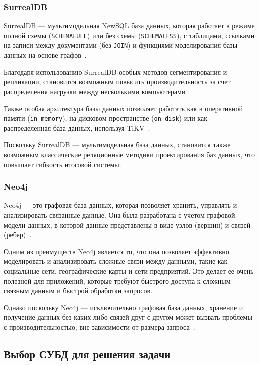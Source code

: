 \subsubsection{SurrealDB}

SurrealDB --- мультимодельная NewSQL база данных, которая работает в режиме полной схемы (\texttt{SCHEMAFULL}) или без схемы (\texttt{SCHEMALESS}), с таблицами, ссылками на записи между документами (без \texttt{JOIN}) и функциями моделирования базы данных на основе графов~\cite{surrealdb}.

Благодаря использованию SurrealDB особых методов сегментирования и репликации, становится возможным повысить производительность за счет распределения нагрузки между несколькими компьютерами~\cite{surrealarch}.

Также особая архитектура базы данных позволяет работать как в оперативной памяти (\texttt{in-memory}), на дисковом пространстве (\texttt{on-disk}) или как распределенная база данных, используя TiKV~\cite{tikv}.

Поскольку SurrealDB --- мультимодельная база данных, становится также возможным классические реляционные методики проектирования баз данных, что повышает гибкость итоговой системы.

\subsubsection{Neo4j}

Neo4j --- это графовая база данных, которая позволяет хранить, управлять и анализировать связанные данные. 
Она была разработана с учетом графовой модели данных, в которой данные представлены в виде узлов (вершин) и связей (ребер)~\cite{neo4j}. 

Одним из преимуществ Neo4j является то, что она позволяет эффективно моделировать и анализировать сложные связи между данными, такие как социальные сети, географические карты и сети предприятий.
Это делает ее очень полезной для приложений, которые требуют быстрого доступа к сложным связным данным и быстрой обработки запросов.

Однако поскольку Neo4j --- исключительно графовая база данных, хранение и получение данных без каких-либо связей друг с другом может вызвать проблемы с производительностью, вне зависимости от размера запроса~\cite{neocons}.

\subsection{Выбор СУБД для решения задачи}

